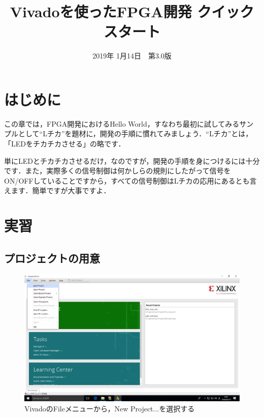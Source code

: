 \documentclass[a4paper,dvipdfmx]{jsarticle}
\begin{document}
\title{Vivadoを使ったFPGA開発 クイックスタート}
\author{}
\date{2019年 1月14日~~第3.0版}
\maketitle

\section{はじめに}
この章では，FPGA開発におけるHello World，すなわち最初に試してみるサンプルとして``Lチカ''を題材に，開発の手順に慣れてみましょう．``Lチカ''とは，「LEDをチカチカさせる」の略です．

単にLEDとチカチカさせるだけ，なのですが，開発の手順を身につけるには十分です．また，実際多くの信号制御は何かしらの規則にしたがって信号をON/OFFしていることですから，すべての信号制御はLチカの応用にあるとも言えます．簡単ですが大事ですよ．

\section{実習}

\subsection{プロジェクトの用意}


 \begin{figure}[H]
  \begin{center}
   \includegraphics[width=.8\textwidth]{chapter03_figures/VirtualBox_Windows10_19_03_2018_00_01_24.png}
  \end{center}
  \caption{VivadoのFileメニューから，New Project...を選択する}
 \end{figure}
\end{document}
